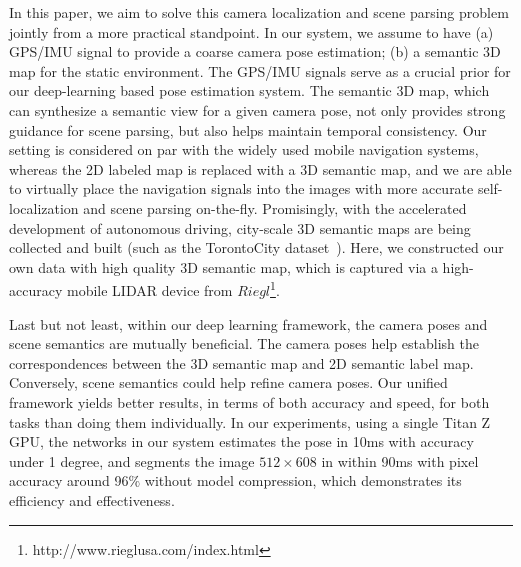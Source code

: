 In this paper, we aim to solve this camera localization and scene parsing problem jointly from a more practical standpoint. In our system, we assume to have (a) GPS/IMU signal to provide a coarse camera pose estimation; (b) a semantic 3D map for the static environment. The GPS/IMU signals serve as a crucial prior for our deep-learning based pose estimation system. The semantic 3D map, which can synthesize a semantic view for a given camera pose, not only provides strong guidance for scene parsing, but also helps maintain temporal consistency.
%
Our setting is considered on par with the widely used mobile navigation systems, whereas the 2D labeled map is replaced with a 3D semantic map, and we are able to virtually place the navigation signals into the images with more accurate self-localization and scene parsing on-the-fly. 
Promisingly, with the accelerated development of autonomous driving, city-scale 3D semantic maps are being collected and built (such as the TorontoCity dataset~\cite{wang2016torontocity}). Here, we constructed our own data with high quality 3D semantic map, which is captured via a high-accuracy mobile LIDAR device from $Riegl$\footnote{http://www.rieglusa.com/index.html}.

Last but not least, within our deep learning framework, the camera poses and scene semantics are mutually beneficial. The camera poses help establish the correspondences between the 3D semantic map and 2D semantic label map. Conversely, scene semantics could help refine camera poses. Our unified framework yields better results, in terms of both accuracy and speed, for both tasks than doing them individually. In our experiments, using a single Titan Z GPU, the networks in our system estimates the pose in 10ms with accuracy under 1 degree, and segments the image $512 \times 608$ in within 90ms with pixel accuracy around 96$\%$ without model compression, which demonstrates its efficiency and effectiveness.

